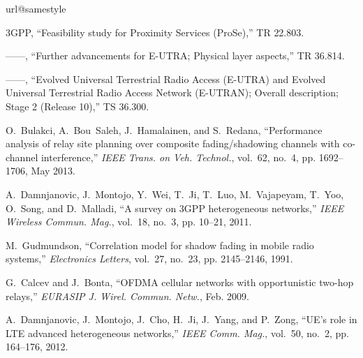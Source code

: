 \documentclass[journal]{IEEEtran}
\begin{document}
\begin{thebibliography}{10}
\providecommand{\url}[1]{#1}
\csname url@samestyle\endcsname
\providecommand{\newblock}{\relax}
\providecommand{\bibinfo}[2]{#2}
\providecommand{\BIBentrySTDinterwordspacing}{\spaceskip=0pt\relax}
\providecommand{\BIBentryALTinterwordstretchfactor}{4}
\providecommand{\BIBentryALTinterwordspacing}{\spaceskip=\fontdimen2\font plus
\BIBentryALTinterwordstretchfactor\fontdimen3\font minus
  \fontdimen4\font\relax}
\providecommand{\BIBforeignlanguage}[2]{{\expandafter\ifx\csname l@#1\endcsname\relax
\typeout{** WARNING: IEEEtran.bst: No hyphenation pattern has been}\typeout{** loaded for the language `#1'. Using the pattern for}\typeout{** the default language instead.}\else
\language=\csname l@#1\endcsname
\fi
#2}}
\providecommand{\BIBdecl}{\relax}
\BIBdecl

3GPP, ``{Feasibility study for Proximity Services (ProSe)},'' TR {22.803}.

------, ``{Further advancements for {E-UTRA}; {P}hysical layer aspects},'' TR
  {36.814}.

------, ``{Evolved Universal Terrestrial Radio Access (E-UTRA) and Evolved
  Universal Terrestrial Radio Access Network (E-UTRAN); Overall description;
  Stage 2 (Release 10)},'' TS {36.300}.

O.~Bulakci, A.~Bou~Saleh, J.~Hamalainen, and S.~Redana, ``Performance analysis
  of relay site planning over composite fading/shadowing channels with
  co-channel interference,'' \emph{IEEE Trans. on Veh. Technol.}, vol.~62,
  no.~4, pp. 1692--1706, May 2013.

A.~Damnjanovic, J.~Montojo, Y.~Wei, T.~Ji, T.~Luo, M.~Vajapeyam, T.~Yoo,
  O.~Song, and D.~Malladi, ``A survey on {3GPP} heterogeneous networks,''
  \emph{{IEEE} Wireless Commun. Mag.}, vol.~18, no.~3, pp. 10--21, 2011.

M.~Gudmundson, ``Correlation model for shadow fading in mobile radio systems,''
  \emph{Electronics Letters}, vol.~27, no.~23, pp. 2145--2146, 1991.

G.~Calcev and J.~Bonta, ``{OFDMA} cellular networks with opportunistic two-hop
  relays,'' \emph{EURASIP J. Wirel. Commun. Netw.}, Feb. 2009.

A.~Damnjanovic, J.~Montojo, J.~Cho, H.~Ji, J.~Yang, and P.~Zong, ``{UE's} role
  in {LTE} advanced heterogeneous networks,'' \emph{IEEE Comm. Mag.}, vol.~50,
  no.~2, pp. 164--176, 2012.


\end{thebibliography}
\end{document}
